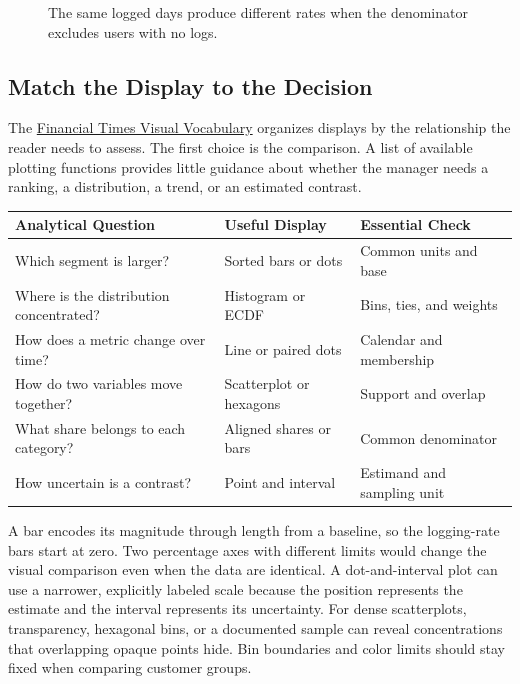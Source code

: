 \begin{figure}[htbp]
\centering

\caption{The same logged days produce different rates when the denominator excludes users with no logs.}\label{fig:M02_logging_denominators}
\end{figure}

\hypertarget{M02-match-the-display-to-the-decision}{%
\subsection{Match the Display to the
Decision}\label{M02-match-the-display-to-the-decision}}

\noindent The
\href{https://github.com/Financial-Times/chart-doctor/blob/main/visual-vocabulary/README.md}{Financial
Times Visual Vocabulary} organizes displays by the relationship the
reader needs to assess. The first choice is the comparison. A list of
available plotting functions provides little guidance about whether the
manager needs a ranking, a distribution, a trend, or an estimated
contrast.

\begin{table}[H]
\centering\small
\begin{tabular}{@{}
  >{\raggedright\arraybackslash}p{}
  >{\raggedright\arraybackslash}p{}
  >{\raggedright\arraybackslash}p{}@{}}
\toprule
Analytical Question & Useful Display & Essential Check \\
\midrule

Which segment is larger? & Sorted bars or dots & Common units and
base \\
Where is the distribution concentrated? & Histogram or ECDF & Bins,
ties, and weights \\
How does a metric change over time? & Line or paired dots & Calendar and
membership \\
How do two variables move together? & Scatterplot or hexagons & Support
and overlap \\
What share belongs to each category? & Aligned shares or bars & Common
denominator \\
How uncertain is a contrast? & Point and interval & Estimand and
sampling unit \\
\bottomrule
\end{tabular}
\end{table}

A bar encodes its magnitude through length from a baseline, so the
logging-rate bars start at zero. Two percentage axes with different
limits would change the visual comparison even when the data are
identical. A dot-and-interval plot can use a narrower, explicitly
labeled scale because the position represents the estimate and the
interval represents its uncertainty. For dense scatterplots,
transparency, hexagonal bins, or a documented sample can reveal
concentrations that overlapping opaque points hide. Bin boundaries and
color limits should stay fixed when comparing customer groups.

